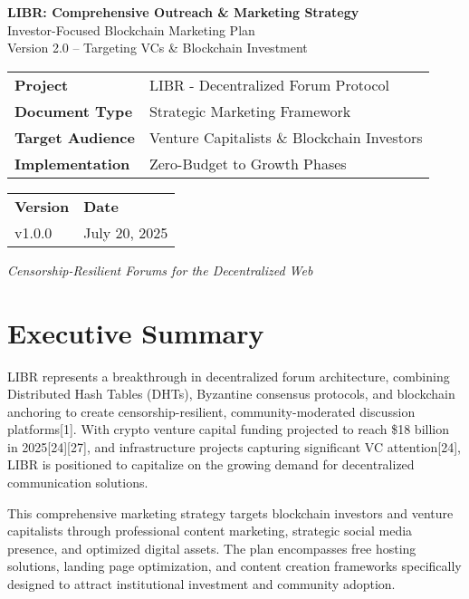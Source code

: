 \documentclass[12pt,a4paper]{article}
\begin{document}
\begin{titlepage}
\centering
\vspace*{2cm}
{\Huge\textbf{LIBR: Comprehensive Outreach \& Marketing Strategy}}\\[0.5cm]
{\Large Investor-Focused Blockchain Marketing Plan}\\[1cm]
{\large Version 2.0 -- Targeting VCs \& Blockchain Investment}\\[2cm]

\begin{tabular}{|l|l|}
\hline
\textbf{Project} & LIBR - Decentralized Forum Protocol \\
\textbf{Document Type} & Strategic Marketing Framework \\
\textbf{Target Audience} & Venture Capitalists \& Blockchain Investors \\
\textbf{Implementation} & Zero-Budget to Growth Phases \\
\hline
\end{tabular}

\vspace{10mm}

\begin{tabular}{|l|l|}
\hline
\textbf{Version} & \textbf{Date} \\
v1.0.0 & July 20, 2025 \\
\hline
\end{tabular}

\vfill
{\large\textit{Censorship-Resilient Forums for the Decentralized Web}}
\end{titlepage}

\tableofcontents
\newpage

\section{Executive Summary}

LIBR represents a breakthrough in decentralized forum architecture, combining Distributed Hash Tables (DHTs), Byzantine consensus protocols, and blockchain anchoring to create censorship-resilient, community-moderated discussion platforms[1]. With crypto venture capital funding projected to reach \$18 billion in 2025[24][27], and infrastructure projects capturing significant VC attention[24], LIBR is positioned to capitalize on the growing demand for decentralized communication solutions.

This comprehensive marketing strategy targets blockchain investors and venture capitalists through professional content marketing, strategic social media presence, and optimized digital assets. The plan encompasses free hosting solutions, landing page optimization, and content creation frameworks specifically designed to attract institutional investment and community adoption.
\end{document}
